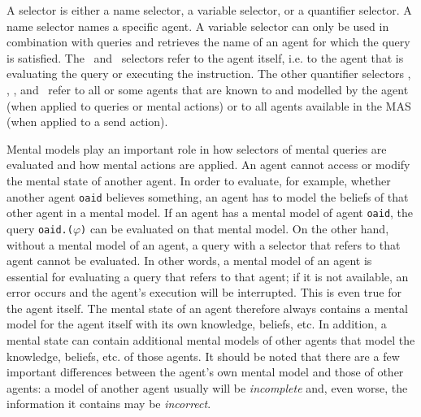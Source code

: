 \documentclass{article}
\begin{document}
A selector is either a name selector, a variable selector, or a quantifier selector. A name selector names a specific agent. A variable selector can only be used in combination with queries and retrieves the name of an agent for which the query is satisfied. The \self\, and \this\, selectors refer to the agent itself, i.e. to the agent that is evaluating the query or executing the instruction. The other quantifier selectors \allp, \allother, \somep, and \someother\, refer to all or some agents that are known to and modelled by the agent (when applied to queries or mental actions) or to all agents available in the MAS (when applied to a send action).

Mental models play an important role in how selectors of mental queries are evaluated and how mental actions are applied. An agent cannot access or modify the mental state of another agent. In order to evaluate, for example, whether another agent \texttt{oaid} believes something, an agent has to model the beliefs of that other agent in a mental model. If an agent has a mental model of agent \texttt{oaid}, the query \texttt{oaid.\belp($\varphi$)} can be evaluated on that mental model. On the other hand, without a mental model of an agent, a query with a selector that refers to that agent cannot be evaluated. In other words, a mental model of an agent is essential for evaluating a query that refers to that agent; if it is not available, an error occurs and the agent's execution will be interrupted. This is even true for the agent itself. The mental state of an agent therefore always contains a mental model for the agent itself with its own knowledge, beliefs, etc. In addition, a mental state can contain additional mental models of other agents that model the knowledge, beliefs, etc. of those agents. It should be noted that there are a few important differences between the agent's own mental model and those of other agents: a model of another agent usually will be \textit{incomplete} and, even worse, the information it contains may be \textit{incorrect}.
\end{document}
